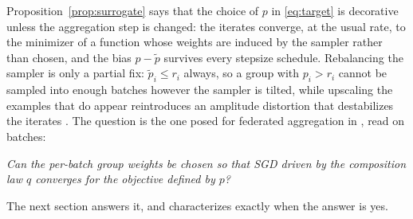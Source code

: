 Proposition~\ref{prop:surrogate} says that the choice of $p$ in
\eqref{eq:target} is decorative unless the aggregation step is changed: the
iterates converge, at the usual rate, to the minimizer of a function whose
weights are induced by the sampler rather than chosen, and the bias
$p-\tilde p$ survives every stepsize schedule. Rebalancing the sampler is
only a partial fix: $\tilde p_i\le r_i$ always, so a group with $p_i>r_i$
cannot be sampled into enough batches however the sampler is tilted, while
upscaling the examples that do appear reintroduces an amplitude distortion
that destabilizes the iterates \cite{rahimi2025fedavot}. The question is the
one posed for federated aggregation in \cite{rahimi2025fedavot}, read on
batches:
\begin{center}
\emph{Can the per-batch group weights be chosen so that SGD driven by the
composition law $q$ converges for the objective defined by $p$?}
\end{center}
The next section answers it, and characterizes exactly when the answer is yes.
